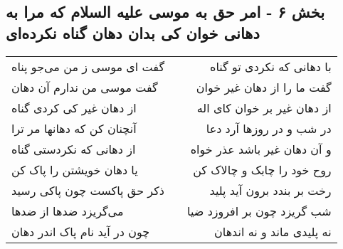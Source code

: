 \begin{center}
\section*{بخش ۶ - امر حق به موسی علیه السلام که مرا به دهانی خوان کی بدان دهان گناه نکرده‌ای}
\label{sec:sh006}
\begin{longtable}{l p{0.5cm} r}
گفت ای موسی ز من می‌جو پناه
&&
با دهانی که نکردی تو گناه
\\
گفت موسی من ندارم آن دهان
&&
گفت ما را از دهان غیر خوان
\\
از دهان غیر کی کردی گناه
&&
از دهان غیر بر خوان کای اله
\\
آنچنان کن که دهانها مر ترا
&&
در شب و در روزها آرد دعا
\\
از دهانی که نکردستی گناه
&&
و آن دهان غیر باشد عذر خواه
\\
یا دهان خویشتن را پاک کن
&&
روح خود را چابک و چالاک کن
\\
ذکر حق پاکست چون پاکی رسید
&&
رخت بر بندد برون آید پلید
\\
می‌گریزد ضدها از ضدها
&&
شب گریزد چون بر افروزد ضیا
\\
چون در آید نام پاک اندر دهان
&&
نه پلیدی ماند و نه اندهان
\\
\end{longtable}
\end{center}

